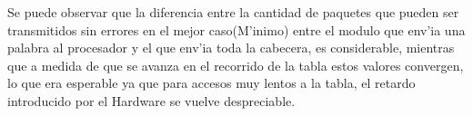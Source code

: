\documentclass[12pt,spanish]{article}
\begin{document}
\begin{figure}[!h]
\end{figure}

\begin{figure}[!h]
\end{figure}



Se puede observar que la diferencia entre la cantidad de paquetes que pueden ser transmitidos sin errores en el mejor caso(M'inimo) entre el modulo que env'ia una palabra al procesador y el que env'ia toda la cabecera, es considerable, mientras que a medida de que se avanza en el recorrido de la tabla estos valores convergen, lo que era esperable ya que para accesos muy lentos a la tabla, el retardo introducido por el Hardware se vuelve despreciable.
\end{document}
